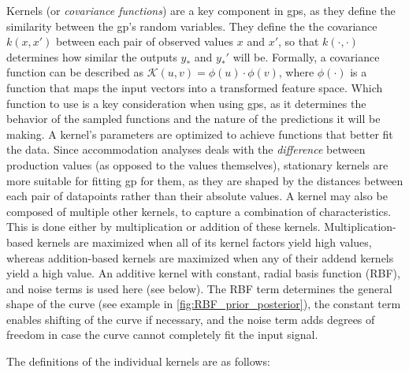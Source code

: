 Kernels (or \textit{covariance functions}) are a key component in \acp{gp}, as they define the similarity between the \acs{gp}'s random variables.
They define the the covariance $k(x, x')$ between each pair of observed values $x$ and $x'$, so that $k(\cdot, \cdot)$ determines how similar the outputs $y_*$ and $y_*'$ will be. 
Formally, a covariance function can be described as $\mathcal{K}(u, v) = \phi(u) \cdot \phi(v)$, where $\phi(\cdot)$ is a function that maps the input vectors into a transformed feature space.
Which function to use is a key consideration when using \acp{gp}, as it determines the behavior of the sampled functions and the nature of the predictions it will be making.
A kernel's parameters are optimized to achieve functions that better fit the data.
Since accommodation analyses deals with the \textit{difference} between production values (as opposed to the values themselves), stationary kernels are more suitable for fitting \ac{gp} for them, as they are shaped by the distances between each pair of datapoints rather than their absolute values.
A kernel may also be composed of multiple other kernels, to capture a combination of characteristics.
This is done either by multiplication or addition of these kernels.
Multiplication-based kernels are maximized when all of its kernel factors yield high values, whereas
addition-based kernels are maximized when any of their addend kernels yield a high value.
An additive kernel with constant, radial basis function (RBF), and noise terms is used here (see  below).
The RBF term determines the general shape of the curve (see example in \cref{fig:RBF_prior_posterior}), the constant term enables shifting of the curve if necessary, and the noise term adds degrees of freedom in case the curve cannot completely fit the input signal.

The definitions of the individual kernels are as follows:

